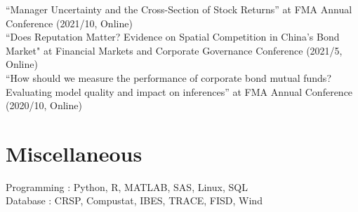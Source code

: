 \documentclass[margin]{res}
\begin{document}
\begin{resume}
``Manager Uncertainty and the Cross-Section of Stock Returns'' at FMA Annual Conference (2021/10, Online)
\\
``Does Reputation Matter? Evidence on Spatial Competition in China’s Bond Market" at Financial Markets and Corporate Governance Conference (2021/5, Online)
\\
``How should we measure the performance of corporate bond mutual funds? Evaluating model quality and impact on inferences'' at FMA Annual Conference (2020/10, Online)
\\

%


\section{\sc Miscellaneous}

Programming : Python, R, MATLAB, SAS, Linux, SQL
\\
Database : CRSP, Compustat, IBES, TRACE, FISD, Wind



\end{resume}
\(\)
\end{document}
